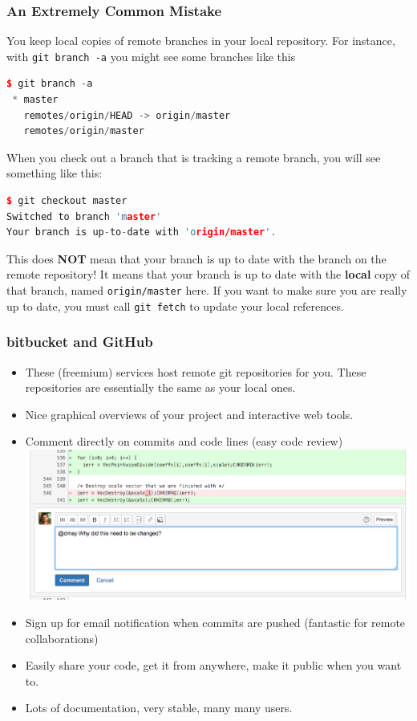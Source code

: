 \documentclass{beamer}
\begin{document}
\begin{frame}[fragile]
\frametitle{An Extremely Common Mistake}
You keep local copies of remote branches in your local repository. For instance, with \lstinline{git branch -a} you might see some branches like this
\begin{lstlisting}[language=C++]
$ git branch -a
 * master
   remotes/origin/HEAD -> origin/master
   remotes/origin/master
\end{lstlisting}
When you check out a branch that is tracking a remote branch, you will see something like this:
\begin{lstlisting}[language=C++]
$ git checkout master
Switched to branch 'master'
Your branch is up-to-date with 'origin/master'.
\end{lstlisting}
This does \textbf{NOT} mean that your branch is up to date with the branch on the remote repository! It means that your branch is up to date with the \textbf{local} copy of that branch, named \lstinline{origin/master} here.
If you want to make sure you are really up to date, you must call \lstinline{git fetch} to update your local references.
\end{frame}

\begin{frame}[fragile]
\frametitle{bitbucket and GitHub}

\begin{itemize}
\item These (freemium) services host remote git repositories for you. These repositories are essentially the same as your local ones.
\item Nice graphical overviews of your project and interactive web tools.
\item Comment directly on commits and code lines (easy code review)
\includegraphics[scale=0.3]{bitbucket1}
\item Sign up for email notification when commits are pushed (fantastic for remote collaborations)
\item Easily share your code, get it from anywhere, make it public when you want to.
\item Lots of documentation, very stable, many many users.
\end{itemize}
\end{frame}
\end{document}
